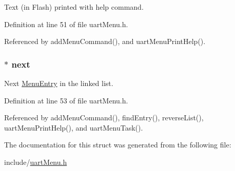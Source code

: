 Text (in Flash) printed with help command. 



Definition at line 51 of file uart\-Menu.\-h.



Referenced by add\-Menu\-Command(), and uart\-Menu\-Print\-Help().

\hypertarget{struct_menu_entry_af79f4060fda1c0b572c15c3dd99b09a5}{
\subsubsection[{next}]{$\ast$ next}}\label{struct_menu_entry_af79f4060fda1c0b572c15c3dd99b09a5}


Next \hyperlink{struct_menu_entry}{Menu\-Entry} in the linked list. 



Definition at line 53 of file uart\-Menu.\-h.



Referenced by add\-Menu\-Command(), find\-Entry(), reverse\-List(), uart\-Menu\-Print\-Help(), and uart\-Menu\-Task().



The documentation for this struct was generated from the following file\-:\begin{DoxyCompactItemize}
\item 
include/\hyperlink{uart_menu_8h}{uart\-Menu.\-h}\end{DoxyCompactItemize}
